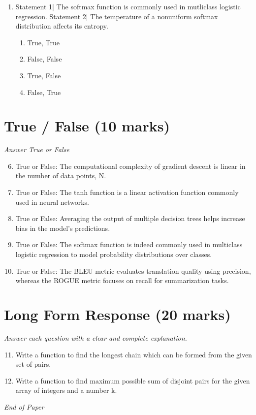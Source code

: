 \documentclass[12pt]{article}
\begin{document}
\begin{enumerate}[label=\arabic*.]
\begin{enumerate}[label=(\alph*)]
    \item False, False
    \item True, False
    \item False, True
\end{enumerate}
\item Statement 1| The softmax function is commonly used in mutliclass logistic regression. Statement 2| The temperature of a nonuniform softmax distribution affects its entropy.
\begin{enumerate}[label=(\alph*)]
    \item True, True
    \item False, False
    \item True, False
    \item False, True
\end{enumerate}
\end{enumerate}

\section*{True / False (10 marks)}
\textit{Answer True or False}
\begin{enumerate}[label=\arabic*.]
\setcounter{enumi}{5}
\item True or False: The computational complexity of gradient descent is linear in the number of data points, N.
\item True or False: The tanh function is a linear activation function commonly used in neural networks.
\item True or False: Averaging the output of multiple decision trees helps increase bias in the model's predictions.
\item True or False: The softmax function is indeed commonly used in multiclass logistic regression to model probability distributions over classes.
\item True or False: The BLEU metric evaluates translation quality using precision, whereas the ROGUE metric focuses on recall for summarization tasks.
\end{enumerate}

\section*{Long Form Response (20 marks)}
\textit{Answer each question with a clear and complete explanation.}
\begin{enumerate}[label=\arabic*.]
\setcounter{enumi}{10}
\item Write a function to find the longest chain which can be formed from the given set of pairs.
\item Write a function to find maximum possible sum of disjoint pairs for the given array of integers and a number k.
\end{enumerate}

\vfill
\noindent\textit{End of Paper}
\end{document}
